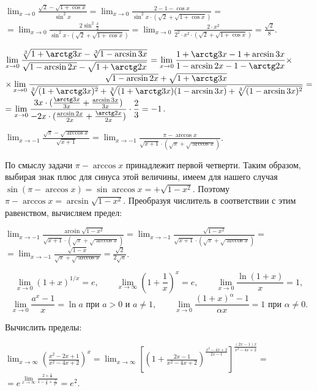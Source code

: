 \documentclass[a5paper,10pt]{article}
\begin{document}
\medskip
{} $\displaystyle\lim_{x\to 0}
\frac{\sqrt2-\sqrt{1+\cos x}}{\sin^2x}=
\lim_{x\to 0}\frac{2-1-\cos x}{\sin^2x\cdot(\sqrt2+\sqrt{1+\cos x})}=$\\
$\displaystyle=\lim_{x\to 0}\frac{2\sin^2\frac{x}{2}}
{\sin^2x\cdot(\sqrt2+\sqrt{1+\cos x})}=
\lim_{x\to 0}\frac{2\cdot x^2}{2^2\cdot x^2\cdot
(\sqrt2+\sqrt{1+\cos x})}=\frac{\sqrt2}{8}$.

\medskip
{} $\displaystyle\lim_{x\to 0}
\frac{\sqrt[3]{1+\arctg3x}-\sqrt[3]{1-\arcsin3x}}
{\sqrt{1-\arcsin2x}-\sqrt{1+\arctg2x}}=
\lim_{x\to 0}\frac{1+\arctg3x-1+\arcsin3x}{1-\arcsin2x-1-\arctg2x}\times$\\
$\displaystyle\times\lim_{x\to 0}\frac{\sqrt{1-\arcsin2x}+\sqrt{1+\arctg3x}}
{\sqrt[3]{(1+\arctg3x)^2}+\sqrt[3]{(1+\arctg3x)(1-\arcsin3x)}+
\sqrt[3]{(1-\arcsin3x)^2}}=$\\
$\displaystyle =\lim_{x\to 0}\frac{3x\cdot(\frac{\arctg3x}{3x}+\frac{\arcsin3x}{3x})}
{-2x\cdot(\frac{\arcsin2x}{2x}+\frac{\arctg2x}{2x})}\cdot\frac23=-1$.

\medskip
{} $\displaystyle\lim_{x\to -1}
\frac{\sqrt{\pi}-\sqrt{\arccos x}}{\sqrt{x+1}}=
\lim_{x\to -1}\frac{\pi-\arccos x}{\sqrt{x+1}\cdot(\sqrt{\pi}+\sqrt{\arccos x})}$.

\noindent
По смыслу задачи $\pi-\arccos x$ принадлежит первой четверти. Таким образом,
выбирая знак плюс для синуса этой величины, имеем для нашего случая
$\sin(\pi-\arccos x)=\sin\arccos x=+\sqrt{1-x^2}.$
Поэтому $\pi-\arccos x=\arcsin\sqrt{1-x^2}$.
Преобразуя числитель в соответствии с этим равенством, вычисляем предел:

\noindent$\displaystyle\lim_{x\to -1}\frac{\arcsin \sqrt{1-x^2}}
{\sqrt{x+1}\cdot(\sqrt{\pi}+\sqrt{\arccos x})}=
\lim_{x\to -1}\frac{\sqrt{1-x^2}}
{\sqrt{x+1}\cdot(\sqrt{\pi}+\sqrt{\arccos x})}=$\\
$\displaystyle=\lim_{x\to -1}\frac{\sqrt{1-x}}
{\sqrt{\pi}+\sqrt{\arccos x}}=\frac{\sqrt2}{2\sqrt{\pi}}$.

\medskip
{}
$$\lim_{x\to0}(1+x)^{1/x}=e,\qquad \lim_{x\to\infty}\left(1+\frac1x\right)^x=e,\qquad\lim_{x\to0}\frac{\ln(1+x)}{x}=1,$$
$$\lim_{x\to0}\frac{a^x-1}{x}=\ln a\mbox{ при }a>0\mbox{ и }a\ne1,\qquad\lim_{x\to0}\frac{(1+x)^\alpha-1}{\alpha x}=1\mbox{ при }\alpha\ne0.$$

\medskip
\noindent Вычислить пределы:

\medskip
{} $\displaystyle\lim_{x\to \infty}
\left(\frac{x^2-2x+1}{x^2-4x+2}\right)^x=
\lim_{x\to \infty}\left[\left(1+\frac{2x-1}{x^2-4x+2}\right)^
{\frac{x^2-4x+2}{2x-1}}\right]^{\frac{(2x-1)x}{x^2-4x+2}}=$\\
$\displaystyle=e^{\lim\limits_{x\to \infty}\frac{2+\frac{1}{x}}
{1-\frac{4}{x}+\frac{2}{x^2}}}=e^2$.
\end{document}
